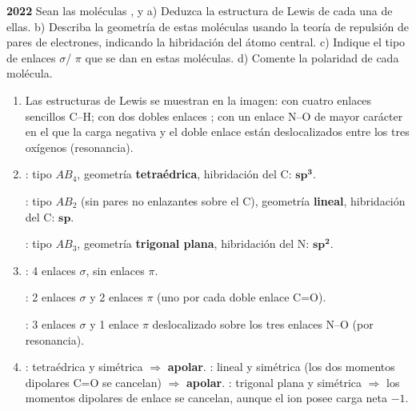 \begin{exerciseEVAU}
    \textbf{2022} Sean las moléculas ,  y  a) Deduzca la estructura de Lewis de cada una de ellas. b) Describa la geometría de estas moléculas usando la teoría de repulsión de pares de electrones, indicando la hibridación del átomo central. c) Indique el tipo de enlaces $\sigma$/ $\pi$ que se dan en estas moléculas. d) Comente la polaridad de cada molécula.

    \begin{solu}


        \begin{enumerate}[label=\letraminuscula]
            \item Las estructuras de Lewis se muestran en la imagen:  con cuatro enlaces sencillos C--H;  con dos dobles enlaces ;  con un enlace N--O de mayor carácter en el que la carga negativa y el doble enlace están deslocalizados entre los tres oxígenos (resonancia).

            \item \textbf{}: tipo \(AB_4\), geometría \textbf{tetraédrica}, hibridación del C: \(\bm{sp^3}\).

            \textbf{}: tipo \(AB_2\) (sin pares no enlazantes sobre el C), geometría \textbf{lineal}, hibridación del C: \(\bm{sp}\).

            \textbf{}: tipo \(AB_3\), geometría \textbf{trigonal plana}, hibridación del N: \(\bm{sp^2}\).

            \item \textbf{}: 4 enlaces \(\sigma\), sin enlaces \(\pi\).

            \textbf{}: 2 enlaces \(\sigma\) y 2 enlaces \(\pi\) (uno por cada doble enlace C=O).

            \textbf{}: 3 enlaces \(\sigma\) y 1 enlace \(\pi\) deslocalizado sobre los tres enlaces N--O (por resonancia).

            \item \textbf{}: tetraédrica y simétrica $\Rightarrow$ \textbf{apolar}. \textbf{}: lineal y simétrica (los dos momentos dipolares C=O se cancelan) $\Rightarrow$ \textbf{apolar}. \textbf{}: trigonal plana y simétrica $\Rightarrow$ los momentos dipolares de enlace se cancelan, aunque el ion posee carga neta \(-1\).
        \end{enumerate}
    \end{solu}
\end{exerciseEVAU}

